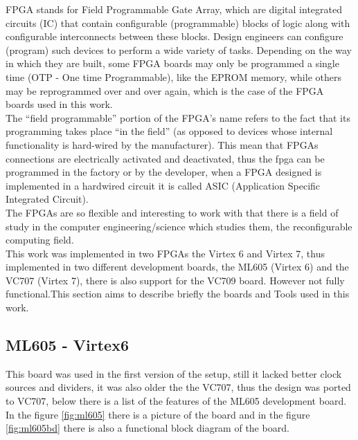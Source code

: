 FPGA stands for Field Programmable Gate Array, which are digital integrated
circuits (IC) that contain configurable (programmable) blocks of logic along
with configurable interconnects between these blocks. Design engineers can
configure (program) such devices to perform a wide variety of tasks. Depending
on the way in which they are built, some FPGA boards may only be programmed a
single time (OTP - One time Programmable), like the EPROM memory, while others
may be reprogrammed over and over again, which is the case of the FPGA boards
used in this work.\cite{max2004}\\

The “field programmable” portion of the FPGA’s name refers to the fact that its
programming takes place “in the field” (as opposed to devices whose internal
functionality is hard-wired by the manufacturer). This mean that FPGAs
connections are electrically activated and deactivated, thus the fpga can be
programmed in the factory or by the developer, when a  FPGA designed is
implemented in a hardwired circuit it is called ASIC (Application Specific
Integrated Circuit).\\

The FPGAs are so flexible and interesting to work with that there is a field of
study in the computer engineering/science which studies them, the reconfigurable
computing field.\\

This work was implemented in two FPGAs the Virtex 6 and Virtex 7, thus
implemented in two different development boards, the ML605 (Virtex 6) and the
VC707 (Virtex 7), there is also support for the VC709 board. However not fully
functional.This section aims to describe briefly the boards and Tools used in
this work.


\subsection{ML605 - Virtex6}
This board was used in the first version of the setup, still it lacked better
clock sources and dividers, it was also older the the VC707, thus the design was
ported to VC707, below there is a list of the features of the ML605 development
board.\\

In the figure \ref{fig:ml605} there is a picture of the board and in the figure
\ref{fig:ml605bd} there is also a functional block diagram of the board.\\

